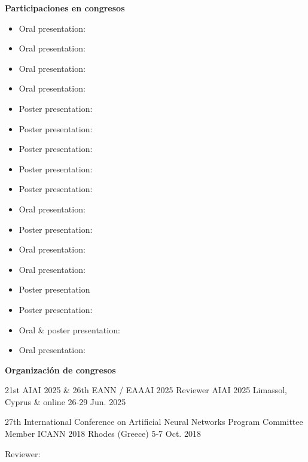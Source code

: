 \textbf{Participaciones en congresos}
% 
\begin{itemize}
 \item Oral presentation: 
 \item Oral presentation: 
 \item Oral presentation: 
 \item Oral presentation: 
 \item Poster presentation:  
 \item Poster presentation:  
 \item Poster presentation: 
 \item Poster presentation: 
 \item Poster presentation: 
 \item Oral presentation:  
 \item Poster presentation: 
 \item Oral presentation: 
 \item Oral presentation:  
 \item Poster presentation
 \item Poster presentation: 
 \item Oral \& poster presentation: 
 \item Oral presentation: 
\end{itemize}

\textbf{Organización de congresos}
\begin{cventries}
	\cventry
	{21st AIAI 2025 & 26th EANN / EAAAI 2025}
	{Reviewer AIAI 2025}
	{Limassol, Cyprus & online}
	{26-29 Jun. 2025}
	{
	}
\end{cventries}
\begin{cventries}
  \cventry
    {27th International Conference on Artificial Neural Networks}
    {Program Committee Member ICANN 2018}
    {Rhodes (Greece)}
    {5‐7 Oct. 2018}
	{\begin{cvitems}
			\item Reviewer: 
	 \end{cvitems}	
	}
\end{cventries}

